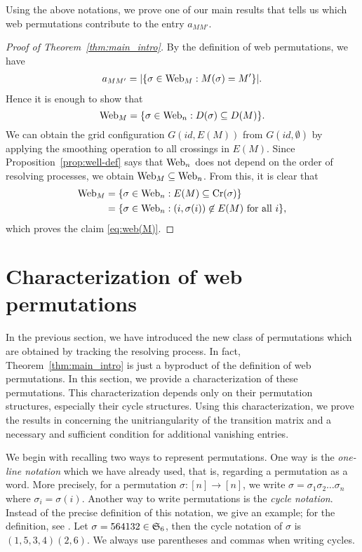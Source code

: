 Using the above notations, we prove one of our main results that tells us which
web permutations contribute to the entry $a_{MM'}$.
\begin{proof}[Proof of Theorem~\ref{thm:main_intro}]
  By the definition of web permutations, we have 
  \begin{align*}
    a_{MM'} = | \{ \sigma\in \operatorname{Web}_M : M(\sigma) = M' \} |.
  \end{align*}
  Hence it is enough to show that
  \begin{equation}\label{eq:web(M)}
    \operatorname{Web}_M = \{ \sigma\in \operatorname{Web}_n : D(\sigma)\subseteq D(M) \}.
  \end{equation}
  We can obtain the grid configuration \( G(id,E(M)) \) from \( G(id,\emptyset) \) by applying the smoothing operation to all crossings in \( E(M) \).
  Since Proposition~\ref{prop:well-def} says that \( \operatorname{Web}_n \) does not depend on the order of resolving processes, we obtain \( \operatorname{Web}_M \subseteq \operatorname{Web}_n \).
  From this, it is clear that
  \begin{align*}
    \operatorname{Web}_M &= \{ \sigma\in \operatorname{Web}_n : E(M)\subseteq \operatorname{Cr}(\sigma)\}  \\
    &= \{ \sigma\in \operatorname{Web}_n : (i,\sigma(i)) \not\in E(M) \mbox{ for all } i \},
  \end{align*}
  which proves the claim \eqref{eq:web(M)}.
\end{proof}

\section{Characterization of web permutations}
\label{sec:characterization}
In the previous section, we have introduced the new class of permutations
which are obtained by tracking the resolving process.
In fact, Theorem~\ref{thm:main_intro} is just a byproduct of the definition of
web permutations.
In this section, we provide a characterization of these permutations.
This characterization depends only on their permutation structures,
especially their cycle structures.
Using this characterization, we prove the results in \cite{RT19,IZ22}
concerning the unitriangularity of the transition matrix and a necessary
and sufficient condition for additional vanishing entries.


We begin with recalling two ways to represent permutations.
One way is the \emph{one-line notation} which we have already used,
that is, regarding a permutation as a word.
More precisely, for a permutation \( \sigma:[n]\rightarrow[n] \),
we write \( \sigma =  \sigma_1 \sigma_2 \dots \sigma_n \)
where \( \sigma_i = \sigma(i) \).
Another way to write permutations is the \emph{cycle notation}.
Instead of the precise definition of this notation, we give an example;
for the definition, see \cite{Sta12}.
Let \( \sigma = 564132\in\mathfrak{S}_6 \), then the cycle notation of \( \sigma \) is \( (1,5,3,4)(2,6) \).
We always use parentheses and commas when writing cycles.

